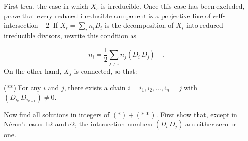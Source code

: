 First treat the case in which $X_s$ is irreducible.  Once this case has been
excluded, prove that every reduced irreducible component is a projective line of
self-intersection $-2$.  If $X_s=\sum_i n_iD_i$ is the decomposition of $X_s$
into reduced irreducible divisors, rewrite this condition as

\begin{equation}\tag{*}
n_i=\frac12\sum_{j\ne i}n_j(D_i\,D_j) \quad .
\end{equation}
On the other hand, $X_s$ is connected, so that:

(**) For any $i$ and $j$, there exists a chain
$i=i_1,i_2,\ldots,i_n=j$ with
$(D_{i_k}\,D_{i_{k+1}})\ne0$.

Now find all solutions in integers of $(*)+(**)$.  First show that, except in
Néron's cases b2 and c2, the intersection numbers $(D_i\,D_j)$ are either zero or
one.

